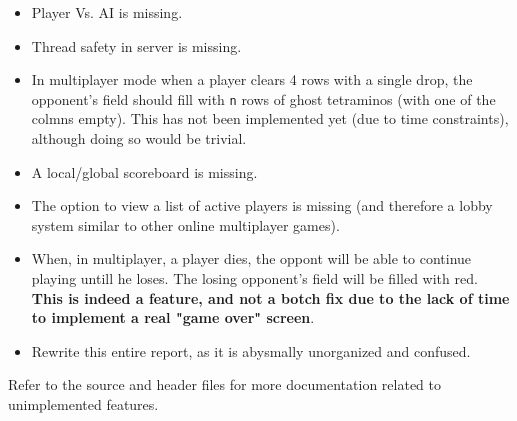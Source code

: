 \documentclass{report}
\begin{document}
\begin{itemize}
  \item Player Vs. AI is missing.
  \item Thread safety in server is missing.
  \item In multiplayer mode when a player clears 4 rows with a single drop, the opponent's field should fill with \texttt{n} rows of ghost tetraminos (with one of the colmns empty). This has not been implemented yet (due to time constraints), although doing so would be trivial.
  \item A local/global scoreboard is missing.
  \item The option to view a list of active players is missing (and therefore a lobby system similar to other online multiplayer games).
  \item When, in multiplayer, a player dies, the oppont will be able to continue playing untill he loses. The losing opponent's field will be filled with red. \textbf{This is indeed a feature, and not a botch fix due to the lack of time to implement a real "game over" screen}.
  \item Rewrite this entire report, as it is abysmally unorganized and confused.
\end{itemize}

\noindent Refer to the source and header files for more documentation related to unimplemented features.
\end{document}
